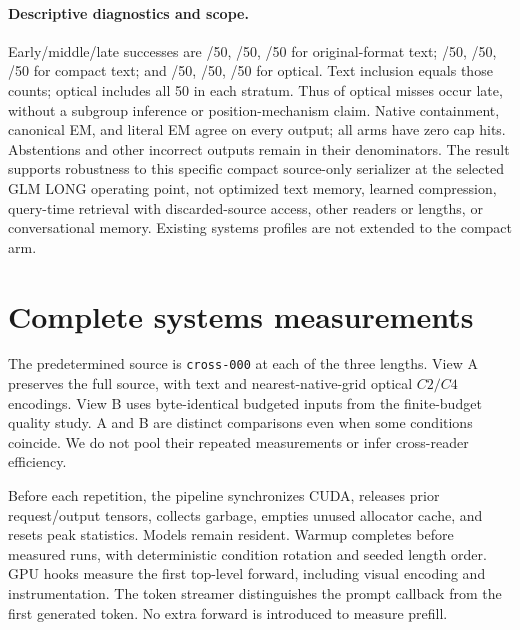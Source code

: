 \paragraph{Descriptive diagnostics and scope.}
Early/middle/late successes are /50, /50, /50 for original-format text; /50, /50, /50 for compact text; and /50, /50, /50 for optical. Text inclusion equals those counts; optical includes all 50 in each stratum. Thus  of  optical misses occur late, without a subgroup inference or position-mechanism claim. Native containment, canonical EM, and literal EM agree on every output; all arms have zero cap hits. Abstentions and other incorrect outputs remain in their denominators. The result supports robustness to this specific compact source-only serializer at the selected GLM LONG operating point, not optimized text memory, learned compression, query-time retrieval with discarded-source access, other readers or lengths, or conversational memory. Existing systems profiles are not extended to the compact arm.

\section{Complete systems measurements}
\label{app:systems}


The predetermined source is \texttt{cross-000} at each of the three lengths. View A preserves the full source, with text and nearest-native-grid optical $C2/C4$ encodings. View B uses byte-identical budgeted inputs from the finite-budget quality study. A and B are distinct comparisons even when some conditions coincide. We do not pool their repeated measurements or infer cross-reader efficiency.

Before each repetition, the pipeline synchronizes CUDA, releases prior request/output tensors, collects garbage, empties unused allocator cache, and resets peak statistics. Models remain resident. Warmup completes before measured runs, with deterministic condition rotation and seeded length order. GPU hooks measure the first top-level forward, including visual encoding and instrumentation. The token streamer distinguishes the prompt callback from the first generated token. No extra forward is introduced to measure prefill.

